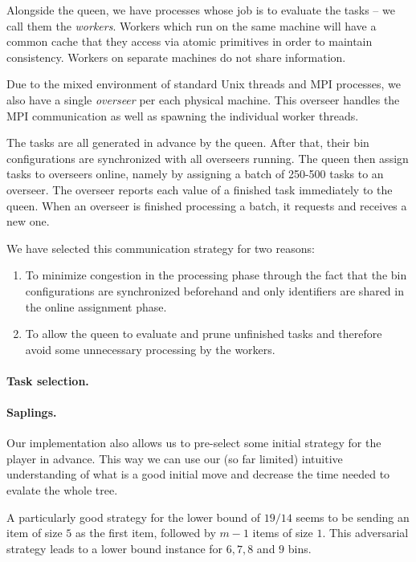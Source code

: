 Alongside the queen, we have processes whose job is to evaluate the
tasks -- we call them the \emph{workers}. Workers which run on the
same machine will have a common cache that they access via atomic
primitives in order to maintain consistency. Workers on separate
machines do not share information.

Due to the mixed environment of standard Unix threads and MPI
processes, we also have a single \emph{overseer} per each physical
machine. This overseer handles the MPI communication as well as
spawning the individual worker threads.

The tasks are all generated in advance by the queen. After that, their
bin configurations are synchronized with all overseers running. The
queen then assign tasks to overseers online, namely by assigning a
batch of 250-500 tasks to an overseer. The overseer reports each value
of a finished task immediately to the queen. When an overseer is
finished processing a batch, it requests and receives a new one.

We have selected this communication strategy for two reasons:

\begin{enumerate}
\item To minimize congestion in the processing phase through the fact
that the bin configurations are synchronized beforehand and only
identifiers are shared in the online assignment phase.
\item To allow the queen to evaluate and prune unfinished tasks and
therefore avoid some unnecessary processing by the workers.
\end{enumerate}

\paragraph{Task selection.}

\paragraph{Saplings.} Our implementation also allows us to pre-select
some initial strategy for the player \adversary in advance. This way
we can use our (so far limited) intuitive understanding of what is a
good initial move and decrease the time needed to evalate the whole
tree.

A particularly good strategy for the lower bound of $19/14$ seems to
be sending an item of size $5$ as the first item, followed by $m-1$
items of size $1$. This adversarial strategy leads to a lower bound
instance for $6,7,8$ and $9$ bins.

